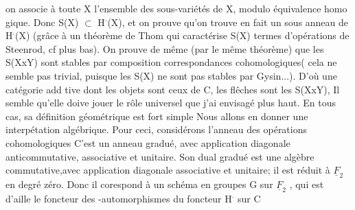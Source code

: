 
 
 on associe à toute X 
 l'ensemble  des sous-variétés  de X, modulo équivalence homo
gique. Donc S(X) $\subset$ H$^{\cdot}$(X), et on prouve qu'on trouve en fait un sous
anneau de H$^{\cdot}$(X) (grâce à un théorème de Thom qui caractérise S(X) 
termes d'opérations de Steenrod, cf plus bas). On prouve de même
(par le même théorème) que les S(XxY) sont stables par composition
correspondances cohomologiques( cela ne semble pas trivial, puisque
les S(X) ne sont pas stables par Gysin...). D'où une catégorie add
tive dont les objets sont ceux de C, les flêches sont les  S(XxY),
Il semble qu'elle doive jouer le rôle universel que j'ai envisagé
plus haut. En tous cas, sa définition géométrique est fort simple
Nous allons en donner une interpétation algébrique. Pour ceci,
considérons l'anneau des opérations cohomologiques  
 \hand{/} C'est un anneau gradué, avec
application diagonale anticommutative,  associative et unitaire. Son
dual gradué est une algèbre  commutative,avec application diagonale
associative et unitaire; il est réduit à $\underline{F}_2$ en degré zéro. Donc il
corespond à un schéma en groupes  G sur $\underline{F}_2$ , qui est d'aille
le foncteur des \unsure{$\otimes$}-automorphismes  du foncteur H$^{\cdot}$ sur C 

